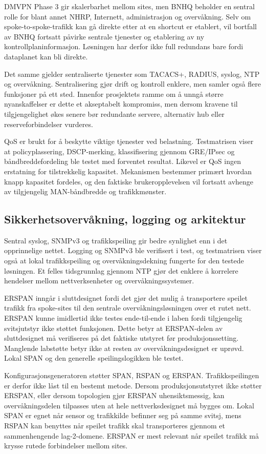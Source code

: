 DMVPN Phase 3 gir skalerbarhet mellom sites, men BNHQ beholder en sentral rolle for blant annet NHRP, Internett, administrasjon og overvåkning. Selv om spoke-to-spoke-trafikk kan gå direkte etter at en shortcut er etablert, vil bortfall av BNHQ fortsatt påvirke sentrale tjenester og etablering av ny kontrollplaninformasjon. Løsningen har derfor ikke full redundans bare fordi dataplanet kan bli direkte.

Det samme gjelder sentraliserte tjenester som TACACS+, RADIUS, syslog, NTP og overvåkning. Sentralisering gjør drift og kontroll enklere, men samler også flere funksjoner på ett sted. Innenfor prosjektets ramme om å unngå større nyanskaffelser er dette et akseptabelt kompromiss, men dersom kravene til tilgjengelighet økes senere bør redundante servere, alternativ hub eller reserveforbindelser vurderes.

QoS er brukt for å beskytte viktige tjenester ved belastning. Testmatrisen viser at policyplassering, DSCP-merking, klassifisering gjennom GRE/IPsec og båndbreddefordeling ble testet med forventet resultat. Likevel er QoS ingen erstatning for tilstrekkelig kapasitet. Mekanismen bestemmer primært hvordan knapp kapasitet fordeles, og den faktiske brukeropplevelsen vil fortsatt avhenge av tilgjengelig MAN-båndbredde og trafikkmønster.

\subsection{Sikkerhetsovervåkning, logging og arkitektur}

Sentral syslog, SNMPv3 og trafikkspeiling gir bedre synlighet enn i det opprinnelige nettet. Logging og SNMPv3 ble verifisert i test, og testmatrisen viser også at lokal trafikkspeiling og overvåkningsdekning fungerte for den testede løsningen. Et felles tidsgrunnlag gjennom NTP gjør det enklere å korrelere hendelser mellom nettverksenheter og overvåkningssystemer.

ERSPAN inngår i sluttdesignet fordi det gjør det mulig å transportere speilet trafikk fra spoke-sites til den sentrale overvåkningsløsningen over et rutet nett. ERSPAN kunne imidlertid ikke testes ende-til-ende i laben fordi tilgjengelig svitsjutstyr ikke støttet funksjonen. Dette betyr at ERSPAN-delen av sluttdesignet må verifiseres på det faktiske utstyret før produksjonssetting. Manglende labstøtte betyr ikke at resten av overvåkningsdesignet er uprøvd. Lokal SPAN og den generelle speilingslogikken ble testet.

Konfigurasjonsgeneratoren støtter SPAN, RSPAN og ERSPAN. Trafikkspeilingen er derfor ikke låst til en bestemt metode. Dersom produksjonsutstyret ikke støtter ERSPAN, eller dersom topologien gjør ERSPAN uhensiktsmessig, kan overvåkningsdelen tilpasses uten at hele nettverksdesignet må bygges om. Lokal SPAN er egnet når sensor og trafikkilde befinner seg på samme svitsj, mens RSPAN kan benyttes når speilet trafikk skal transporteres gjennom et sammenhengende lag-2-domene. ERSPAN er mest relevant når speilet trafikk må krysse rutede forbindelser mellom sites.

